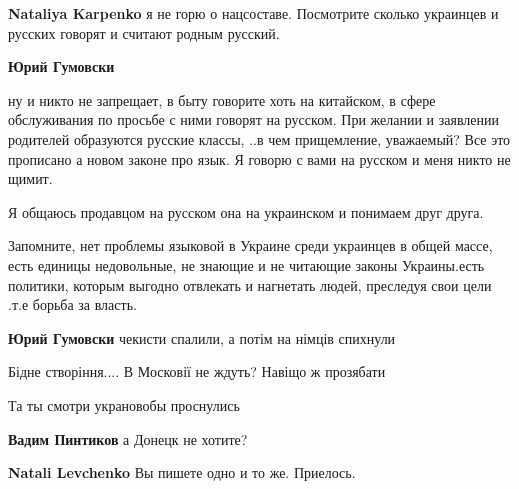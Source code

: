 \begin{itemize}
\begin{itemize}
\textbf{Nataliya Karpenko} я не горю о нацсоставе. Посмотрите сколько украинцев и русских говорят и считают родным русский.


\textbf{Юрий Гумовски} 

ну и никто не запрещает, в быту говорите хоть на китайском, в сфере
обслуживания по просьбе с ними говорят на русском. При желании и заявлении
родителей образуются русские классы, ..в чем прищемление, уважаемый? Все это
прописано а новом законе про язык. Я говорю с вами на русском и меня никто не
щимит. 

Я общаюсь продавцом на русском она на украинском и понимаем друг друга.

Запомните, нет проблемы языковой в Украине среди украинцев в общей массе, есть
единицы недовольные, не знающие и не читающие законы Украины.есть политики,
которым выгодно отвлекать и нагнетать людей, преследуя свои цели .т.е борьба за
власть.


\textbf{Юрий Гумовски} чекисти спалили, а потім на німців спихнули

\end{itemize}


Бідне створіння.... В Московії не ждуть? Навіщо ж прозябати


Та ты смотри украновобы проснулись

\begin{itemize}

\textbf{Вадим Пинтиков} а Донецк не хотите?


\textbf{Natali Levchenko} Вы пишете одно и то же. Приелось.


\end{itemize}
\end{itemize}
